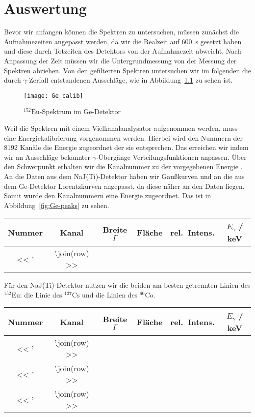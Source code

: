 \documentclass[11pt, ngerman, fleqn, DIV=15, headinclude, BCOR=2cm]{scrreprt}
\newcommand{\plotwidth}{0.8\linewidth}
\begin{document}
\chapter{Auswertung}

Bevor wir anfangen können die Spektren zu untersuchen, müssen zunächst die
Aufnahmezeiten angepasst werden, da wir die Realzeit auf \SI{600}{\second} gesetzt
haben und diese durch Totzeiten des Detektors von der Aufnahmezeit abweicht.
Nach Anpassung der Zeit müssen wir die Untergrundmessung von der Messung der Spektren 
abziehen. Von den gefilterten Spektren untersuchen wir im folgenden die durch
$\gamma$-Zerfall entstandenen Ausschläge, wie in
Abbildung~\ref{fig:energiekalibrierung} zu sehen ist.

\begin{figure}
    \centering
    \texttt{[image: Ge\_calib]}
    \caption{%
	    $^{152}\text{Eu}$-Spektrum im Ge-Detektor
    }
    \label{fig:energiekalibrierung}
\end{figure}

Weil die Spektren mit einem Vielkanalanalysator aufgenommen werden, muss eine
Energiekalibrierung vorgenommen werden. Hierbei wird den Nummern der 8192
Kanäle die Energie zugeordnet der sie entsprechen.
Das erreichen wir indem wir an Ausschläge bekannter $\gamma$-Übergänge
Verteilungsfunktionen anpassen. Über den Schwerpunkt erhalten wir die Kanalnummer zu 
der vorgegebenen Energie . 
An die Daten aus dem NaJ(Ti)-Detektor haben wir Gaußkurven und an die
aus dem Ge-Detektor Lorentzkurven angepasst, da diese näher an den Daten liegen.
Somit wurde den Kanalnummern eine Energie zugeordnet. Das ist in
Abbildung~\ref{fig:Ge-peaks} zu sehen.

\begin{tabular}{SSSSSS}
    {Nummer} & {Kanal} & {Breite $\Gamma$} & {Fläche} & {rel.\ Intens.} &
    {$E_\gamma$ / \si{\kilo\electronvolt}} \\
    \midrule
    << ' & '.join(row) >> \\
\end{tabular}

Für den NaJ(Ti)-Detektor nutzen wir die beiden am besten getrennten Linien des
$^{152}\text{Eu}$: die Linie des $^{137}\text{Cs}$ und die Linien des
$^{60}\text{Co}$.

\begin{tabular}{SSSSSS}
    {Nummer} & {Kanal} & {Breite $\Gamma$} & {Fläche} & {rel.\ Intens.} &
    {$E_\gamma$ / \si{\kilo\electronvolt}} \\
    \midrule
    << ' & '.join(row) >> \\
    \midrule
    << ' & '.join(row) >> \\
    \midrule
    << ' & '.join(row) >> \\
\end{tabular}
\end{document}
